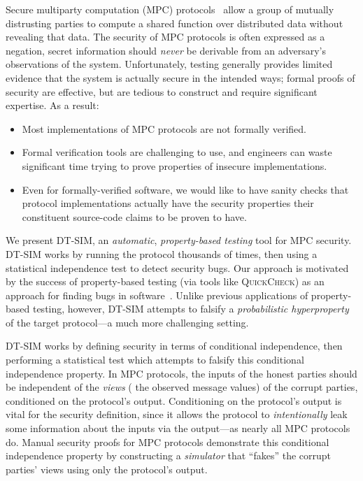 \documentclass[compsoc, conference, a4paper, 10pt, times]{IEEEtran}
\newcommand{\toolname}{\textsc{DT-SIM}\xspace}
\begin{document}
Secure multiparty computation (MPC) protocols~\cite{evans2018pragmatic} allow a group of mutually distrusting parties to compute a shared function over distributed data without revealing that data. The security of MPC protocols is often expressed as a negation,
\eg{} secret information should \textit{never} be derivable from an adversary's observations of the system.
Unfortunately, testing generally provides limited evidence that the system is actually secure in the intended ways; formal proofs of security are effective, but are tedious to construct and require significant expertise. As a result:
%
\begin{itemize}
\item Most implementations of MPC protocols are not formally verified.
\item Formal verification tools are challenging to use, and engineers can waste significant time trying to prove properties of insecure implementations.
\item Even for formally-verified software, we would like to have sanity checks
  that protocol implementations actually have the security properties their constituent source-code claims to be proven to have.
\end{itemize}

We present \toolname, an \emph{automatic}, \emph{property-based testing} tool for MPC security. \toolname works by running the protocol thousands of times, then using a statistical independence test to detect security bugs. Our approach is motivated by the success of property-based testing (via tools like \textsc{QuickCheck}) as an approach for finding bugs in software~\cite{fink1997property, claessen2000quickcheck, paraskevopoulou2015foundational}. Unlike previous applications of property-based testing, however, \toolname attempts to falsify a \emph{probabilistic hyperproperty} of the target protocol---a much more challenging setting.

\toolname works by defining security in terms of conditional independence, then performing a statistical test which attempts to falsify this conditional independence property. In MPC protocols, the inputs of the honest parties should be independent of the \emph{views} (\ie{} the observed message values) of the corrupt parties, conditioned on the protocol's output. Conditioning on the protocol's output is vital for the security definition, since it allows the protocol to \emph{intentionally} leak some information about the inputs via the output---as nearly all MPC protocols do. Manual security proofs for MPC protocols demonstrate this conditional independence property by constructing a \emph{simulator} that ``fakes'' the corrupt parties' views using only the protocol's output.
\end{document}
